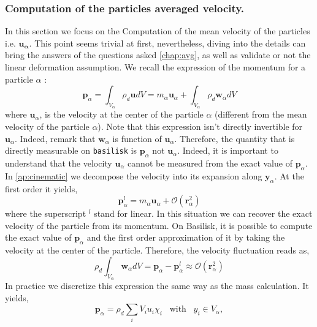 \subsubsection*{Computation of the particles averaged velocity.}
In this section we focus on the Computation of the mean velocity of the particles i.e. $\bm{u_\alpha}$. 
This point seems trivial at first, nevertheless, diving into the details can bring the answers of the questions asked \ref{chap:avg}, as well as validate or not the linear deformation assumption. 
We recall the expression of the momentum for a particle $\alpha$ :
\begin{equation}
    \bm{p}_\alpha 
    = \int_{V_\alpha} \rho_d \bm{u} dV
    = m_\alpha \bm{u}_\alpha 
    + \int_{V_\alpha} \rho_d \bm{w}_\alpha dV
\end{equation}
where $\bm{u}_\alpha$, is the velocity at the center of the particle $\alpha$ (different from the mean velocity of the particle $\alpha$). 
Note that this expression isn't directly invertible for $\bm{u}_\alpha$. 
Indeed, remark that $\bm{w}_\alpha$ is function of $\bm{u}_\alpha$.
Therefore, the quantity that is directly measurable on \texttt{basilisk} is $\bm{p}_\alpha$ not $\bm{u}_\alpha$. 
Indeed, it is important to understand that the velocity $\bm{u}_\alpha$ cannot be measured from the exact value of $\bm{p}_\alpha$.
In \ref{ap:cinematic} we decompose the velocity into its expansion along $\bm{y}_\alpha$. 
At the first order it yields, 
\begin{equation}
    \bm{p}_\alpha^l 
    = m_\alpha \bm{u}_\alpha + \mathcal{O}(\bm{r}_\alpha^2)
\end{equation}
where the superscript $^l$ stand for linear. 
In this situation we can recover the exact velocity of the particle from its momentum. 
On Basilisk, it is possible to compute the exact value of $\bm{p}_\alpha$ and the first order approximation of it by taking the velocity at the center of the particle. 
Therefore, the velocity fluctuation reads as, 
\begin{equation}
    \rho_d \int_{V_\alpha} \bm{w}_\alpha dV
    = \bm{p}_\alpha -\bm{p}_\alpha^l
    \approx \mathcal{O}(\bm{r}_\alpha^2)
\end{equation}
In practice we discretize this expression the same way as the mass calculation.
It yields, 
\begin{equation}
    \bm{p}_\alpha = \rho_d\sum_{i} V_i u_i \chi_i \;\;\; \text{with} \;\;\;y_i \in V_\alpha,
\end{equation}
